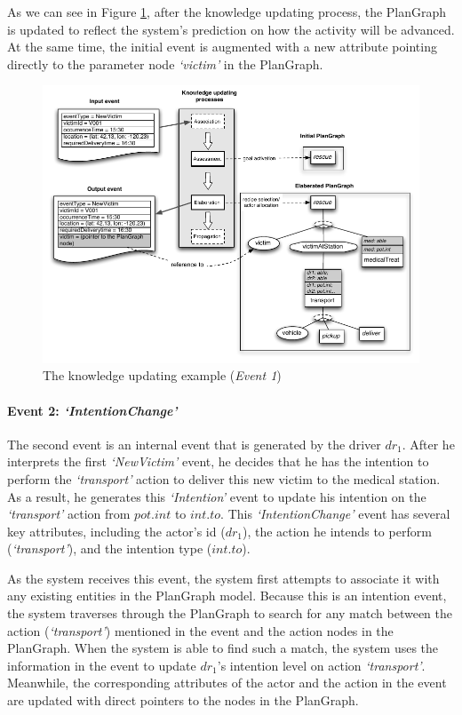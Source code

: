 As we can see in Figure \ref{fig:update_example_event1}, after the knowledge updating process, the PlanGraph is updated to reflect the system's prediction on how the activity will be advanced. At the same time, the initial event is augmented with a new attribute pointing directly to the parameter node \emph{`victim'} in the PlanGraph.
\begin{figure}[htbp] %
	\centering
	\includegraphics{update_example_event1.pdf} 
	\caption{The knowledge updating example (\emph{Event 1})}
	\label{fig:update_example_event1}
\end{figure}
\paragraph*{Event 2: \emph{`IntentionChange'}} %
\label{par:event_2_emph}
The second event is an internal event that is generated by the driver $dr_1$. After he interprets the first \emph{`NewVictim'} event, he decides that he has the intention to perform the \emph{`transport'} action to deliver this new victim to the medical station. As a result, he generates this \emph{`Intention'} event to update his intention on the \emph{`transport'} action from $pot.int$ to $int.to$. This \emph{`IntentionChange'} event has several key attributes, including the actor's id ($dr_1$), the action he intends to perform (\emph{`transport'}), and the intention type ($int.to$).

As the system receives this event, the system first attempts to associate it with any existing entities in the PlanGraph model. Because this is an intention event, the system traverses through the PlanGraph to search for any match between the action (\emph{`transport'}) mentioned in the event  and the action nodes in the PlanGraph. When the system is able to find such a match, the system uses the information in the event to update $dr_1$'s intention level on action \emph{`transport'}. Meanwhile, the corresponding attributes of the actor and the action in the event are updated with direct pointers to the nodes in the PlanGraph.


